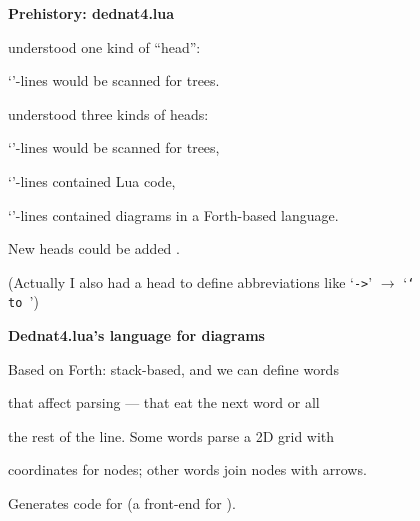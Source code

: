 \documentclass[oneside]{book}
\begin{document}
{\bf Prehistory: dednat4.lua}

 understood one kind of ``head'':

`\ColorGreen{\tt \%:}'-lines would be scanned for trees.

\msk

 understood three kinds of heads:

`\ColorGreen{\tt \%:}'-lines would be scanned for trees,

`'-lines contained Lua code,

`'-lines contained diagrams in a Forth-based language.

New heads could be added .

\bsk
\bsk
\bsk

{\scriptsize

(Actually I also had a head to define abbreviations
like `{\tt ->}' $→$ `{\tt \char`\\to\ }')

}

\newpage



{\bf Dednat4.lua's language for diagrams}

Based on Forth: stack-based, and we can define words

that affect parsing --- that eat the next word or all

the rest of the line. Some words parse a 2D grid with

coordinates for nodes; other words join nodes with arrows.

Generates code for  (a front-end for ).

\def\BCCL{\mathsf{BCCL}}
\end{document}
